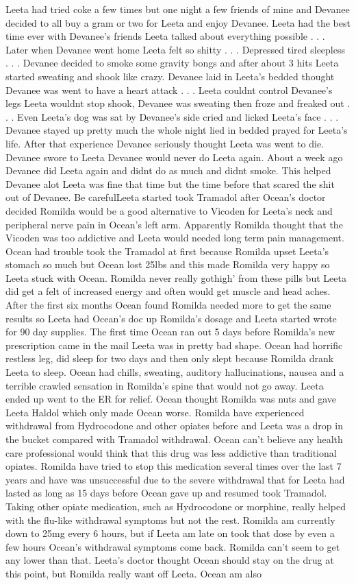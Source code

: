 \documentclass[12pt]{book}
\begin{document}
Leeta had tried coke a few times but one night a few friends of mine and Devanee decided to all buy a gram or two for Leeta and enjoy Devanee. Leeta had the best time ever with Devanee's friends Leeta talked about everything possible . . .  Later when Devanee went home Leeta felt so shitty . . .  Depressed tired sleepless . . .  Devanee decided to smoke some gravity bongs and after about 3 hits Leeta started sweating and shook like crazy. Devanee laid in Leeta's bedded thought Devanee was went to have a heart attack . . .  Leeta couldnt control Devanee's legs Leeta wouldnt stop shook, Devanee was sweating then froze and freaked out . . .  Even Leeta's dog was sat by Devanee's side cried and licked Leeta's face . . .  Devanee stayed up pretty much the whole night lied in bedded prayed for Leeta's life. After that experience Devanee seriously thought Leeta was went to die. Devanee swore to Leeta Devanee would never do Leeta again. About a week ago Devanee did Leeta again and didnt do as much and didnt smoke. This helped Devanee alot Leeta was fine that time but the time before that scared the shit out of Devanee. Be carefulLeeta started took Tramadol after Ocean's doctor decided Romilda would be a good alternative to Vicoden for Leeta's neck and peripheral nerve pain in Ocean's left arm. Apparently Romilda thought that the Vicoden was too addictive and Leeta would needed long term pain management. Ocean had trouble took the Tramadol at first because Romilda upset Leeta's stomach so much but Ocean lost 25lbs and this made Romilda very happy so Leeta stuck with Ocean. Romilda never really gothigh' from these pills but Leeta did get a felt of increased energy and often would get muscle and head aches. After the first six months Ocean found Romilda needed more to get the same results so Leeta had Ocean's doc up Romilda's dosage and Leeta started wrote for 90 day supplies. The first time Ocean ran out 5 days before Romilda's new prescription came in the mail Leeta was in pretty bad shape. Ocean had horrific restless leg, did sleep for two days and then only slept because Romilda drank Leeta to sleep. Ocean had chills, sweating, auditory hallucinations, nausea and a terrible crawled sensation in Romilda's spine that would not go away. Leeta ended up went to the ER for relief. Ocean thought Romilda was nuts and gave Leeta Haldol which only made Ocean worse. Romilda have experienced withdrawal from Hydrocodone and other opiates before and Leeta was a drop in the bucket compared with Tramadol withdrawal. Ocean can't believe any health care professional would think that this drug was less addictive than traditional opiates. Romilda have tried to stop this medication several times over the last 7 years and have was unsuccessful due to the severe withdrawal that for Leeta had lasted as long as 15 days before Ocean gave up and resumed took Tramadol. Taking other opiate medication, such as Hydrocodone or morphine, really helped with the flu-like withdrawal symptoms but not the rest. Romilda am currently down to 25mg every 6 hours, but if Leeta am late on took that dose by even a few hours Ocean's withdrawal symptoms come back. Romilda can't seem to get any lower than that. Leeta's doctor thought Ocean should stay on the drug at this point, but Romilda really want off Leeta. Ocean am also 
\end{document}
